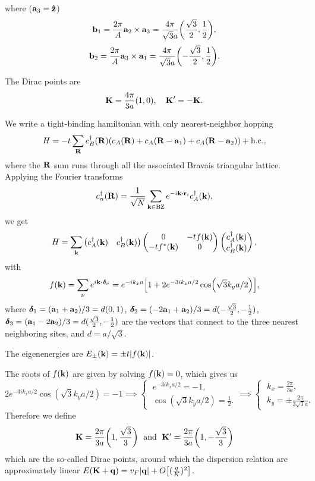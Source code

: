 \documentclass[a4paper,10pt]{article}
\begin{document}
where (${\vb{a}}_3 = \vu{z}$)
$$
{\vb{b}}_1 = \frac{2\pi}{A} {\vb{a}}_2 \times {\vb{a}}_3 = \frac{4\pi}{\sqrt{3} a } \qty(\frac{\sqrt{3}}{2}, \frac{1}{2}),
$$
$$
{\vb{b}}_2 = \frac{2\pi}{A} {\vb{a}}_3 \times {\vb{a}}_1 = \frac{4\pi}{\sqrt{3} a } \qty(-\frac{\sqrt{3}}{2}, \frac{1}{2}).
$$

The Dirac points are
$$
{\vb{K}} = \frac{4\pi}{3a} (1, 0) , \quad {\vb{K}}' = -{\vb{K}}.
$$



We write a tight-binding hamiltonian with only nearest-neighbor hopping
$$
H = -t \sum_{{\vb{R}}} c^{\dagger}_B({\vb{R}}) \qty(c_A({\vb{R}}) + c_A({\vb{R}}-{\vb{a}}_1) + c_A({\vb{R}}-{\vb{a}}_2)) + {\text{h.c.}},
$$
where the ${\vb{R}}$ sum runs through all the associated Bravais triangular lattice. Applying the Fourier transforms
$$
c_{\alpha}^\d(\R) = \frac{1}{\sqrt{N}} \sum_{\k \in \text{BZ}} e^{-i \k \vdot \r_i} c_A^\d(\k),
$$
we get
$$
H = \sum_{{\vb{k}}}
\begin{pmatrix}
c_A^{\dagger}({\vb{k}}) & c_B^{\dagger}({\vb{k}})
\end{pmatrix}
\begin{pmatrix}
0 & -t f({\vb{k}}) \\
-t f^*({\vb{k}}) & 0
\end{pmatrix}
\begin{pmatrix}
c_A^{\dagger}({\vb{k}}) \\ c_B^{\dagger}({\vb{k}})
\end{pmatrix},
$$
with
$$
f(\k) = \sum_{\nu} e^{i \k \vdot \bm{\delta}_\nu} =
e^{-i k_x a} \qty[ 1 + 2 e^{-3ik_x a / 2} \cos(\sqrt{3} k_y a / 2) ],
$$
where $\bm{\delta}_1 = ({\vb{a}}_1 + {\vb{a}}_2)/3 = d (0, 1)$, $\bm{\delta}_2 = (-2{\vb{a}}_1 + {\vb{a}}_2)/3 = d(-\frac{\sqrt{3}}{2}, -\frac{1}{2})$, $\bm{\delta}_3 = ({\vb{a}}_1 - 2{\vb{a}}_2)/3 = d (\frac{\sqrt{3}}{2}, -\frac{1}{2})$ are the vectors that connect to the three nearest neighboring sites, and $d = a/\sqrt{3}$.

The eigenenergies are $E_\pm({\vb{k}}) = \pm t \abs{f({\vb{k}})}$.

The roots of $f({\vb{k}})$ are given by solving $f({\vb{k}}) = 0$, which gives us
$$
2 e^{-3ik_x a / 2} \cos(\sqrt{3} k_y a / 2) = -1 \implies
\begin{cases}
\; e^{-3i k_x a/2} = - 1, \\
\; \cos(\sqrt{3} k_y a / 2) = \frac{1}{2}.
\end{cases}
\implies
\begin{cases}
\; k_x = \frac{2\pi}{3a}, \\
\; k_y = \pm \frac{2\pi}{3 \sqrt{3} a},
\end{cases}
$$
Therefore we define
$$
{\vb{K}} = \frac{2\pi}{3a} \qty(1, \frac{\sqrt{3}}{3}) \; \text{ and } \;
{\vb{K}}' = \frac{2\pi}{3a} \qty(1, -\frac{\sqrt{3}}{3})
$$
which are the so-called Dirac points, around which the dispersion relation are approximately linear $E({\vb{K}} + {\vb{q}}) = v_F \abs{{\vb{q}}} + O\qty[(\frac{q}{K})^2]$.


%


\end{document}
